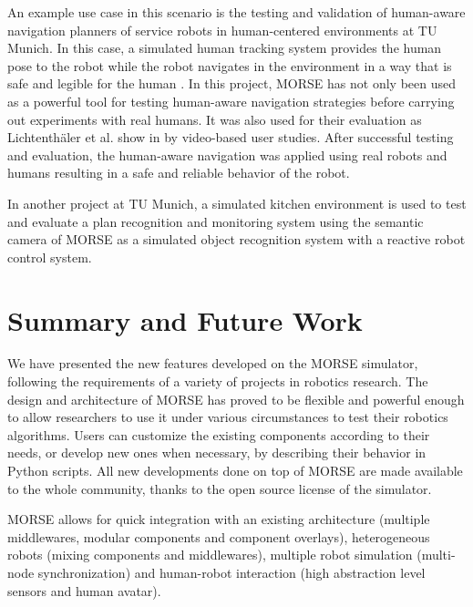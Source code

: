 \documentclass{llncs}
\newcommand{\serge}[1]{\nb{Serge}{blue}{#1}}
\begin{document}
An example use case in this scenario is the testing and validation of human-aware
navigation planners of service robots in human-centered environments at TU Munich.
In this case, a simulated human tracking system provides the human pose to the
robot while the robot navigates in the environment in a way that is safe and
legible for the human \cite{kruse10exploiting}. In this project, MORSE has not only been used as a
powerful tool for testing human-aware navigation strategies before carrying out
experiments with real humans. It was also used for their evaluation as
Lichtenth{\"a}ler et al. show in \cite{lichtenthaeler2012increasing} by
video-based user studies. After successful testing and evaluation, the
human-aware navigation was applied using real robots and humans resulting in
a safe and reliable behavior of the robot.

In another project at TU Munich, a simulated kitchen environment is used
to test and evaluate a plan recognition and monitoring system using the
semantic camera of MORSE as a simulated object recognition system with
a reactive robot control system.


\section{Summary and Future Work}
\label{section:discussion}

We have presented the new features developed on the MORSE simulator,
following the requirements of a variety of projects in robotics research.
The design and architecture of MORSE has proved to be flexible and powerful
enough to allow researchers to use it under various circumstances to test their
robotics algorithms. Users can customize the existing components according to
their needs, or develop new ones when necessary, by describing their behavior
in Python scripts.
All new developments done on top of MORSE are made available to the whole
community, thanks to the open source license of the simulator.

MORSE allows for quick integration with an existing architecture (multiple
middlewares, modular components and component overlays), heterogeneous robots
(mixing components and middlewares), multiple robot simulation (multi-node
synchronization) and human-robot interaction (high abstraction level sensors
and human avatar).
\end{document}
